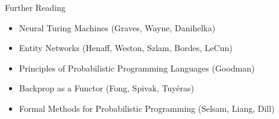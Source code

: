 \documentclass{beamer}
\begin{document}
\begin{frame}{Further Reading}
	\begin{itemize}
	\item \alert{Neural Turing Machines} (Graves, Wayne, Danihelka)
	\item \alert{Entity Networks} (Henaff, Weston, Szlam, Bordes, LeCun)
	\item \alert{Principles of Probabilistic Programming Languages} (Goodman)
	\item \alert{Backprop as a Functor} (Fong, Spivak, Tuyéras)
	\item \alert{Formal Methods for Probabilistic Programming} (Selsam, Liang, Dill)
	\end{itemize}
\end{frame}
\end{document}
